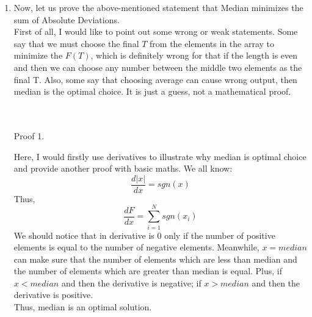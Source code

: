 \documentclass[12pt,a4paper]{article}
\makeatletter
\newtheorem*{solution}{Solution}
\renewenvironment{solution}[1][Solution] {\par\pushQED{\qed}\normalfont\topsep6\p@\@plus6\p@\relax\trivlist\item[\hskip\labelsep\bfseries#1\@addpunct{.}]\ignorespaces}{\popQED\endtrivlist\@endpefalse} \makeatother
\makeatother
\begin{document}
\begin{enumerate}
\begin{solution}
Now, let us prove the above-mentioned statement that Median minimizes the sum of Absolute Deviations.\\
First of all, I would like to point out some wrong or weak statements. Some say that we must choose the final $T$ from the elements in the array to minimize the $F(T)$, which is definitely wrong for that if the length is even and then we can choose any number between the middle two elements as the final T. Also, some say that choosing average can cause wrong output, then median is the optimal choice. It is just a guess, not a mathematical proof. \\
\pagebreak
\\\\

\begin{bf}Proof 1.\end{bf} Here, I would firstly use derivatives to illustrate why median is optimal choice and provide another proof with basic maths.
We all know:
\begin{equation*}
	\frac{d|x|}{dx}=sgn(x)
\end{equation*}
Thus,
\begin{equation*}
	\frac{dF}{dx}=\sum_{i=1}^{N} sgn(x_i)
\end{equation*}
We should notice that in derivative is $0$ only if the number of positive elements is equal to the number of negative elements. Meanwhile, $x=median$ can make sure that the number of elements which are less than median and the number of elements which are greater than median is equal. Plus, if $x<median$ and then the derivative is negative; if $x>median$ and then the derivative is positive.\\Thus, median is an optimal solution.\\


\end{solution}
\end{enumerate}
\end{document}
